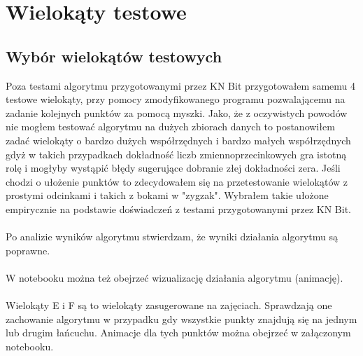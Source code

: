 \documentclass[a4paper]{article}
\begin{document}
    \pagebreak
\section{Wielokąty testowe}
    \subsection{Wybór wielokątów testowych}    
    Poza testami algorytmu przygotowanymi przez KN Bit przygotowałem samemu 4 testowe wielokąty,
    przy pomocy zmodyfikowanego programu pozwalającemu na zadanie kolejnych punktów za pomocą myszki.
    Jako, że z oczywistych powodów nie mogłem testować algorytmu na dużych zbiorach danych 
    to postanowiłem zadać wielokąty o bardzo dużych współrzędnych i bardzo małych współrzędnych
    gdyż w takich przypadkach dokładność liczb zmiennoprzecinkowych gra istotną rolę i mogłyby 
    wystąpić błędy sugerujące dobranie złej dokładności zera. Jeśli chodzi o ułożenie punktów
    to zdecydowałem się na przetestowanie wielokątów z prostymi odcinkami i takich z 
    bokami w "zygzak". Wybrałem takie ułożone empirycznie na podstawie doświadczeń z 
    testami przygotowanymi przez KN Bit.\\\\
    Po analizie wyników algorytmu stwierdzam, że wyniki działania algorytmu są poprawne. \\\\
    W notebooku można też obejrzeć wizualizację działania algorytmu (animację).\\\\
    Wielokąty E i F są to wielokąty zasugerowane na zajęciach. Sprawdzają one zachowanie 
    algorytmu w przypadku gdy wszystkie punkty znajdują się na jednym lub drugim łańcuchu. Animacje
    dla tych punktów można obejrzeć w załączonym notebooku.
    \pagebreak
\end{document}
